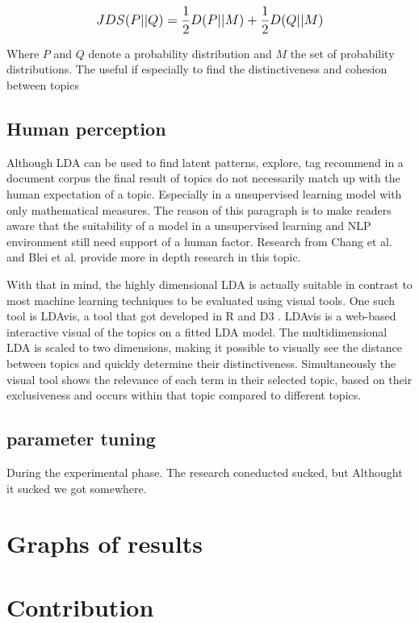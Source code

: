 \[
\mathlarger{JDS(P||Q) = \frac{1}{2}D(P||M) + \frac{1}{2}D(Q||M)}
\]

Where $P$ and $Q$ denote a probability distribution and $M$ the set of probability distributions. The useful if especially to find the distinctiveness and cohesion between topics

\subsection{Human perception}\label{results:humanperception}
Although LDA can be used to find latent patterns, explore, tag recommend in a document corpus the final result of topics do not necessarily match up with the human expectation of a topic. Especially in a unsupervised learning model with only mathematical measures\cite{Towne2016MeasuringPerception}. The reason of this paragraph is to make readers aware that the suitability of a model in a unsupervised learning and NLP environment still need support of a human factor. Research from Chang  et al. \cite{Chang2009ReadingModels} and Blei et al. \cite{Chaney2012VisualizingModels.} provide more in depth research in this topic.  

With that in mind, the highly dimensional LDA is actually suitable in contrast to most machine learning techniques to be evaluated using visual tools. One such tool is LDAvis, a tool that got developed in R and D3 \cite{Sievert2014}. LDAvis is a web-based interactive visual of the topics on a fitted LDA model. The multidimensional LDA is scaled to two dimensions, making it possible to visually see the distance between topics and quickly determine their distinctiveness. Simultaneously the visual tool shows the relevance of each term in their selected topic, based on their exclusiveness and occurs within that topic compared to different topics.

\subsection{parameter tuning}\label{results:parameter tuning}
During the experimental phase. The research coneducted sucked, but Althought it sucked we got somewhere. 

\section{Graphs of results}

\section{Contribution}\label{results:contribution}

